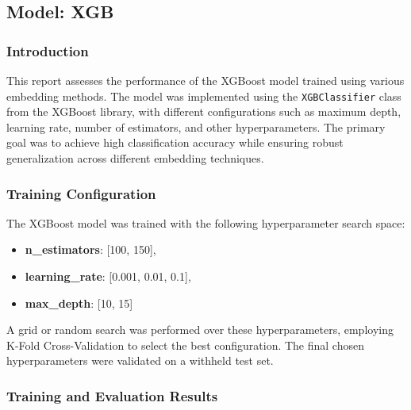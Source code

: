 \subsection{Model: XGB}

\subsubsection{Introduction}

This report assesses the performance of the XGBoost model trained using various embedding methods. The model was implemented using the \texttt{XGBClassifier} class from the XGBoost library, with different configurations such as maximum depth, learning rate, number of estimators, and other hyperparameters. The primary goal was to achieve high classification accuracy while ensuring robust generalization across different embedding techniques.

\subsubsection{Training Configuration}

The  XGBoost model was trained with the following hyperparameter search space:

\begin{itemize}
    \item \textbf{n\_estimators}:  [100, 150],
    \item \textbf{learning\_rate}: [0.001, 0.01, 0.1],
    \item \textbf{max\_depth}: [10, 15]
\end{itemize}



A grid or random search was performed over these hyperparameters, employing K-Fold Cross-Validation to select the best configuration. The final chosen hyperparameters were validated on a withheld test set.

\subsubsection{Training and Evaluation Results}

